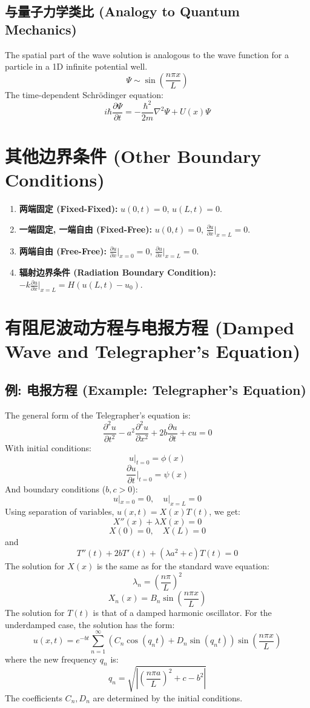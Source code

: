 \documentclass{article}
\begin{document}
	\subsection*{与量子力学类比 (Analogy to Quantum Mechanics)}
	The spatial part of the wave solution is analogous to the wave function for a particle in a 1D infinite potential well.
	$$ \Psi \sim \sin\left(\frac{n\pi x}{L}\right) $$
	The time-dependent Schrödinger equation:
	$$ i\hbar \frac{\partial \Psi}{\partial t} = -\frac{\hbar^2}{2m} \nabla^2 \Psi + U(x)\Psi $$
	
	\section*{其他边界条件 (Other Boundary Conditions)}
	\begin{enumerate}
		\item \textbf{两端固定 (Fixed-Fixed):} $u(0,t)=0$, $u(L,t)=0$.
		\item \textbf{一端固定, 一端自由 (Fixed-Free):} $u(0,t)=0$, $\frac{\partial u}{\partial x}\bigg|_{x=L}=0$.
		\item \textbf{两端自由 (Free-Free):} $\frac{\partial u}{\partial x}\bigg|_{x=0}=0$, $\frac{\partial u}{\partial x}\bigg|_{x=L}=0$.
		\item \textbf{辐射边界条件 (Radiation Boundary Condition):} $-k\frac{\partial u}{\partial x}\bigg|_{x=L} = H(u(L,t) - u_0)$.
	\end{enumerate}
	
	\section*{有阻尼波动方程与电报方程 (Damped Wave and Telegrapher's Equation)}
	
	\subsection*{例: 电报方程 (Example: Telegrapher's Equation)}
	The general form of the Telegrapher's equation is:
	$$ \frac{\partial^2 u}{\partial t^2} - a^2 \frac{\partial^2 u}{\partial x^2} + 2b \frac{\partial u}{\partial t} + c u = 0 $$
	With initial conditions:
	$$ u|_{t=0} = \phi(x) $$
	$$ \frac{\partial u}{\partial t}\bigg|_{t=0} = \psi(x) $$
	And boundary conditions ($b, c > 0$):
	$$ u|_{x=0} = 0, \quad u|_{x=L} = 0 $$
	Using separation of variables, $u(x,t) = X(x)T(t)$, we get:
	$$ X''(x) + \lambda X(x) = 0 $$
	$$ X(0) = 0, \quad X(L) = 0 $$
	and
	$$ T''(t) + 2b T'(t) + (\lambda a^2 + c) T(t) = 0 $$
	The solution for $X(x)$ is the same as for the standard wave equation:
	$$ \lambda_n = \left(\frac{n\pi}{L}\right)^2 $$
	$$ X_n(x) = B_n \sin\left(\frac{n\pi x}{L}\right) $$
	The solution for $T(t)$ is that of a damped harmonic oscillator. For the underdamped case, the solution has the form:
	$$ u(x,t) = e^{-bt} \sum_{n=1}^{\infty} \left(C_n \cos(q_n t) + D_n \sin(q_n t)\right) \sin\left(\frac{n\pi x}{L}\right) $$
	where the new frequency $q_n$ is:
	$$ q_n = \sqrt{\left|\left(\frac{n\pi a}{L}\right)^2 + c - b^2\right|} $$
	The coefficients $C_n, D_n$ are determined by the initial conditions.
	
\end{document}
